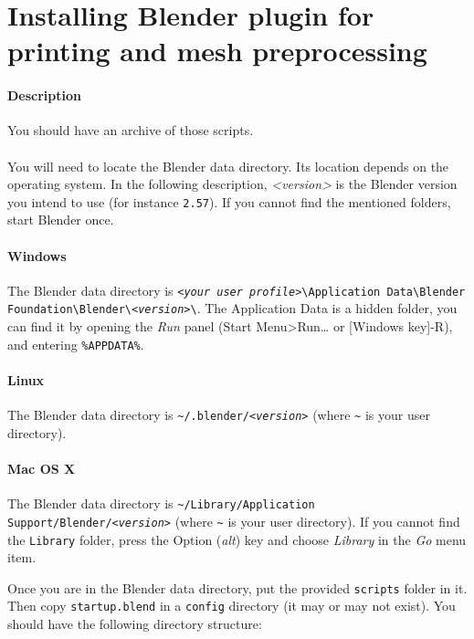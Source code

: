 \documentclass{article}
\begin{document}
\section{Installing Blender plugin for printing and mesh preprocessing}

	\paragraph{Description} You should have an archive of those scripts.

	\paragraph{}
	You will need to locate the Blender data directory. Its location depends on
	the operating system. In the following description, \emph{<version>} is the
	Blender version you intend to use (for instance \texttt{2.57}). If you cannot find the mentioned folders, start Blender once.

	\paragraph{Windows} The Blender data directory is \texttt{\emph{<your user profile>}\textbackslash{}Application Data\textbackslash{}Blender Foundation\textbackslash{}Blender\textbackslash{}\emph{<version>}\textbackslash{}}. The Application Data is a hidden folder, you can find it by opening the \emph{Run} panel (Start Menu>Run… or [Windows key]-R), and entering \texttt{\%APPDATA\%}. 

	\paragraph{Linux} The Blender data directory is \texttt{\~ {}/.blender/\emph{<version>}} (where \texttt{\~{}} is your user directory).
	
	\paragraph{Mac OS X} The Blender data directory is \texttt{\~{}/Library/Application Support/Blender/\emph{<version>}} (where \texttt{\~{}} is your user directory). If you cannot find the \texttt{Library} folder, press the Option (\emph{alt}) key and choose \emph{Library} in the \emph{Go} menu item.
	
	Once you are in the Blender data directory, put the provided \texttt{scripts} folder in it. Then copy \texttt{startup.blend} in a \texttt{config} directory (it may or may not exist). You should have the following directory structure:\\
\end{document}
